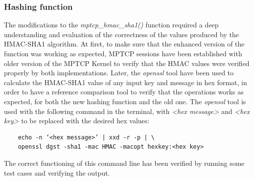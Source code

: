 \subsubsection{Hashing function}
The modifications to the \textit{mptcp\_hmac\_sha1()} function required a deep understanding and evaluation of the correctness of the values produced by the HMAC-SHA1 algorithm. At first, to make sure that the enhanced version of the function was working as expected, MPTCP sessions have been established with older version of the MPTCP Kernel to verify that the HMAC values were verified properly by both implementations. Later, the \textit{openssl} tool have been used to calculate the HMAC-SHA1 value of any input key and message in hex format, in order to have a reference comparison tool to verify that the operations works as expected, for both the new hashing function and the old one. The \textit{openssl} tool is used with the following command in the terminal, with \textit{<hex message>} and \textit{<hex key>} to be replaced with the desired hex values:

\begin{verbatim}
	echo -n ‘<hex message>’ | xxd -r -p | \
	openssl dgst -sha1 -mac HMAC -macopt hexkey:<hex key>
\end{verbatim}

The correct functioning of this command line has been verified by running some test cases \cite{rfc2202} and verifying the output.

